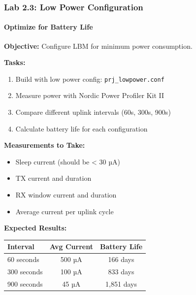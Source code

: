 \documentclass{beamer}
\begin{document}
\begin{frame}
\frametitle{Lab 2.3: Low Power Configuration}
\framesubtitle{Optimize for Battery Life}

\textbf{Objective:} Configure LBM for minimum power consumption.

\textbf{Tasks:}
\begin{enumerate}
    \item Build with low power config: \texttt{prj\_lowpower.conf}
    \item Measure power with Nordic Power Profiler Kit II
    \item Compare different uplink intervals (60s, 300s, 900s)
    \item Calculate battery life for each configuration
\end{enumerate}

\textbf{Measurements to Take:}
\begin{itemize}
    \item Sleep current (should be < 30 µA)
    \item TX current and duration
    \item RX window current and duration
    \item Average current per uplink cycle
\end{itemize}

\textbf{Expected Results:}
\begin{table}
\footnotesize
\begin{tabular}{|l|c|c|}
\hline
\textbf{Interval} & \textbf{Avg Current} & \textbf{Battery Life} \\
\hline
60 seconds & 500 µA & 166 days \\
300 seconds & 100 µA & 833 days \\
900 seconds & 45 µA & 1,851 days \\
\hline
\end{tabular}
\end{table}
\end{frame}
\end{document}
